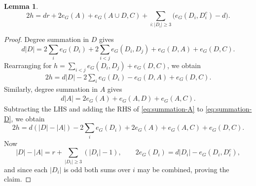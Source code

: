 \documentclass[10pt,a4paper]{amsart}
\newtheorem{lemma}[thm]{Lemma}
\begin{document}
\begin{lemma}\label{lem:ge-boundary-identity}
\begin{equation}\label{eq:ge-exact}
 2h=dr+2e_G(A)+e_G(A\cup D,C)  +\sum_{i:|D_i|\ge3}\bigl(e_G(D_i,D_i^c)-d\bigr).
\end{equation}
\end{lemma}

\begin{proof}
Degree summation in $D$ gives
\[
    d |D|= 2 \sum_{i} e_G(D_i)+ 2 \sum_{i<j} e_G(D_i, D_j) + e_G(D, A) + e_G(D, C).
\]
Rearranging for $h=\sum_{i<j}e_G(D_i,D_j)+e_G(D,C)$, we obtain
\begin{align} \label{eq:summation-D}
    2h=d|D|-2\sum_ie_G(D_i)-e_G(D,A)+e_G(D,C).
\end{align}
Similarly, degree summation in $A$ gives
\begin{align} \label{eq:summation-A}
    d |A| = 2 e_G(A) + e_G(A, D) + e_G(A, C).
\end{align}
Subtracting the LHS and adding the RHS of \eqref{eq:summation-A} to \eqref{eq:summation-D}, we obtain
\[
2h= d( |D|-|A|) - 2 \sum_{i} e_G(D_i) + 2 e_G(A) + e_G(A, C) + e_G(D, C).
\]
Now
\[
 |D|-|A|=r+\sum_{|D_i|\ge3}(|D_i|-1),  \qquad 2e_G(D_i)=d|D_i|-e_G(D_i,D_i^c),
\]
and since each $|D_i|$ is odd both sums over $i$ may be combined, proving the claim.
\end{proof}



\end{document}
